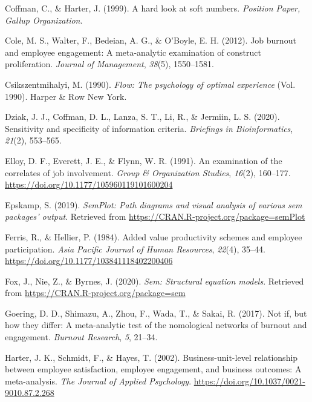 \documentclass[
  english,
  man]{apa6}
\begin{document}
\leavevmode\hypertarget{ref-coffman_hard_1999}{}%
Coffman, C., \& Harter, J. (1999). A hard look at soft numbers. \emph{Position Paper, Gallup Organization}.

\leavevmode\hypertarget{ref-cole2012job}{}%
Cole, M. S., Walter, F., Bedeian, A. G., \& O'Boyle, E. H. (2012). Job burnout and employee engagement: A meta-analytic examination of construct proliferation. \emph{Journal of Management}, \emph{38}(5), 1550--1581.

\leavevmode\hypertarget{ref-csikszentmihalyi1990flow}{}%
Csikszentmihalyi, M. (1990). \emph{Flow: The psychology of optimal experience} (Vol. 1990). Harper \& Row New York.

\leavevmode\hypertarget{ref-dziak2020sensitivity}{}%
Dziak, J. J., Coffman, D. L., Lanza, S. T., Li, R., \& Jermiin, L. S. (2020). Sensitivity and specificity of information criteria. \emph{Briefings in Bioinformatics}, \emph{21}(2), 553--565.

\leavevmode\hypertarget{ref-elloy_examination_1991}{}%
Elloy, D. F., Everett, J. E., \& Flynn, W. R. (1991). An examination of the correlates of job involvement. \emph{Group \& Organization Studies}, \emph{16}(2), 160--177. \url{https://doi.org/10.1177/105960119101600204}

\leavevmode\hypertarget{ref-R-semPlot}{}%
Epskamp, S. (2019). \emph{SemPlot: Path diagrams and visual analysis of various sem packages' output}. Retrieved from \url{https://CRAN.R-project.org/package=semPlot}

\leavevmode\hypertarget{ref-ferris_added_1984}{}%
Ferris, R., \& Hellier, P. (1984). Added value productivity schemes and employee participation. \emph{Asia Pacific Journal of Human Resources}, \emph{22}(4), 35--44. \url{https://doi.org/10.1177/103841118402200406}

\leavevmode\hypertarget{ref-R-sem}{}%
Fox, J., Nie, Z., \& Byrnes, J. (2020). \emph{Sem: Structural equation models}. Retrieved from \url{https://CRAN.R-project.org/package=sem}

\leavevmode\hypertarget{ref-goering2017not}{}%
Goering, D. D., Shimazu, A., Zhou, F., Wada, T., \& Sakai, R. (2017). Not if, but how they differ: A meta-analytic test of the nomological networks of burnout and engagement. \emph{Burnout Research}, \emph{5}, 21--34.

\leavevmode\hypertarget{ref-harter_business-unit-level_2002}{}%
Harter, J. K., Schmidt, F., \& Hayes, T. (2002). Business-unit-level relationship between employee satisfaction, employee engagement, and business outcomes: A meta-analysis. \emph{The Journal of Applied Psychology}. \url{https://doi.org/10.1037/0021-9010.87.2.268}
\end{document}
